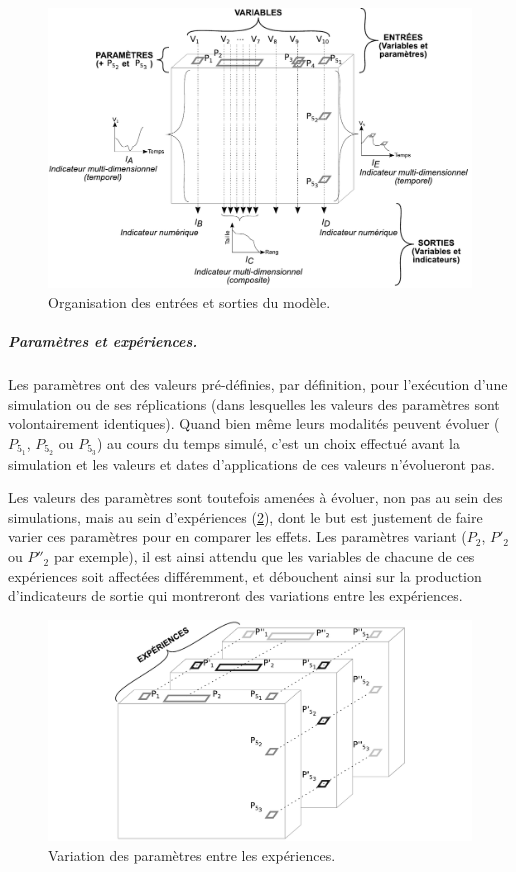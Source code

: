 \begin{figure}[H]
	\includegraphics[width=\linewidth]{img/schemas_params_3_complet.pdf}
	\caption{Organisation des entrées et sorties du modèle.} 
	\label{fig:parametres-these-complet} 
\end{figure}

\subparagraph{Paramètres et expériences.}
Les paramètres ont des valeurs pré-définies, par définition, pour l'exécution d'une simulation ou de ses réplications (dans lesquelles les valeurs des paramètres sont volontairement identiques).
Quand bien même leurs modalités peuvent évoluer ($P_{5_{1}}$, $P_{5_{2}}$ ou $P_{5_{3}}$) au cours du temps simulé, c'est un choix effectué avant la simulation et les valeurs et dates d'applications de ces valeurs n'évolueront pas.

Les valeurs des paramètres sont toutefois amenées à évoluer, non pas au sein des simulations, mais au sein d'expériences (\cref{fig:parametres-these-experiences}), dont le but est justement de faire varier ces paramètres pour en comparer les effets.
Les paramètres variant ($P_2$, $P'_2$ ou $P''_2$ par exemple), il est ainsi attendu que les variables de chacune de ces expériences soit affectées différemment, et débouchent ainsi sur la production d'indicateurs de sortie qui montreront des variations entre les expériences.

\begin{figure}[H]
	\includegraphics[width=\linewidth]{img/schemas_params_4_experiences.pdf}
	\caption{Variation des paramètres entre les expériences.} 
	\label{fig:parametres-these-experiences} 
\end{figure}


